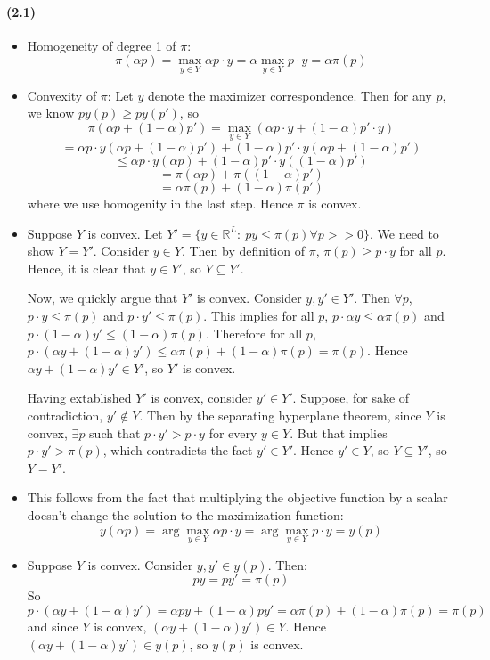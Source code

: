 \documentclass[10pt,letter]{article}
\begin{document}
\paragraph{(2.1)}
\begin{itemize}
\item Homogeneity of degree 1 of $\pi$: \[ \pi(\alpha p) = \max_{y \in Y} \alpha p \cdot y =  \alpha \max_{y \in Y} p \cdot y = \alpha \pi(p) \]
\item Convexity of $\pi$: Let $y$ denote the maximizer correspondence. Then for any $p$, we know $py(p) \ge py(p')$, so
\[ \pi(\alpha p + (1-\alpha)p') = \max_{y \in Y} \left( \alpha p \cdot y + (1-\alpha)p' \cdot y \right) \]
\[ = \alpha p \cdot y(\alpha p + (1-\alpha) p') + (1-\alpha)p' \cdot y(\alpha p + (1-\alpha) p') \]
\[ \le \alpha p \cdot y(\alpha p) + (1-\alpha)p' \cdot y((1-\alpha) p') \]
\[ = \pi(\alpha p) + \pi((1-\alpha)p') \]
\[ = \alpha \pi(p) + (1-\alpha)\pi(p') \]
where we use homogenity in the last step. Hence $\pi$ is convex.
\item Suppose $Y$ is convex. Let $Y' = \{ y \in \mathbb{R}^L: \ py \le \pi(p) \forall p >> 0 \} $. We need to show $Y = Y'$. Consider $y\in Y$. Then by definition of $\pi$, $\pi(p) \ge p\cdot y$ for all $p$. Hence, it is clear that $y \in Y'$, so $Y \subseteq Y'$.

Now, we quickly argue that $Y'$ is convex. Consider $y, y' \in Y'$. Then $\forall p$, $p\cdot y \le \pi(p)$ and $p\cdot y' \le \pi(p)$. This implies for all $p$, $p \cdot \alpha y \le \alpha \pi(p)$ and $p \cdot (1-\alpha) y' \le (1-\alpha) \pi(p)$. Therefore for all $p$, $p \cdot (\alpha y + (1-\alpha)y' ) \le \alpha \pi(p) + (1-\alpha)\pi(p) = \pi(p)$. Hence $\alpha y + (1-\alpha)y' \in Y'$, so $Y'$ is convex.

Having extablished $Y'$ is convex, consider $y' \in Y'$. Suppose, for sake of contradiction, $y' \not \in Y$. Then by the separating hyperplane theorem, since $Y$ is convex, $\exists p$ such that $p \cdot y' > p \cdot y$ for every $y \in Y$. But that implies $p\cdot y' > \pi(p)$, which contradicts the fact $y' \in Y'$. Hence $y' \in Y$, so $Y \subseteq Y'$, so $Y = Y'$.
\item This follows from the fact that multiplying the objective function by a scalar doesn't change the solution to the maximization function:
\[ y(\alpha p) = \arg \max_{y\in Y} \alpha p\cdot y = \arg \max_{y\in Y} p\cdot y = y(p) \]
\item Suppose $Y$ is convex. Consider $y, y' \in y(p)$. Then:
\[ py = py' = \pi(p) \]
So
\[ p\cdot (\alpha y + (1-\alpha)y') = \alpha py + (1-\alpha)py' = \alpha \pi(p) + (1-\alpha)\pi(p) = \pi(p) \]
and since $Y$ is convex, $(\alpha y + (1-\alpha)y') \in Y$. Hence $(\alpha y + (1-\alpha)y') \in y(p)$, so $y(p)$ is convex.


\end{itemize}
\end{document}
